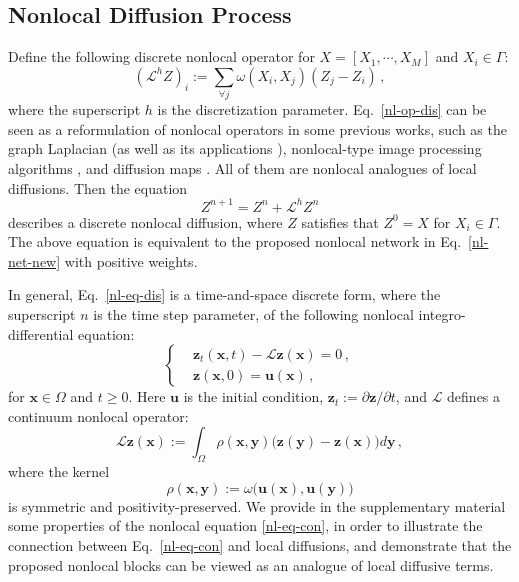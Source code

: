 \documentclass{article}
\newcommand{\xb}{\bm{x}}
\newcommand{\yb}{\bm{y}}
\newcommand{\zb}{\bm{z}}
\newcommand{\ub}{\bm{u}}
\begin{document}
\subsection{Nonlocal Diffusion Process}
Define the following discrete nonlocal operator for $X=[X_1,\cdots,X_M]$ and $X_i\in\Gamma$:
\begin{equation}\label{nl-op-dis}
(\mathcal{L}^h Z)_i := \sum_{\forall j} \omega(X_i,X_j)(Z_j-Z_i)\,,
\end{equation}
where the superscript $h$ is the discretization parameter. Eq.~\eqref{nl-op-dis} can be seen as a reformulation of nonlocal operators in some previous works, such as the graph Laplacian \cite{chung1997spectral} (as well as its applications \cite{liu2009robust,liu2010large,liu2012robust,wu2018multi}), nonlocal-type image processing algorithms \cite{buades2005review,gilboa2007nonlocal}, and diffusion maps \cite{coifman2006diffusion}. All of them are nonlocal analogues \cite{du2012analysis} of local diffusions. %
Then the equation
\begin{equation}\label{nl-eq-dis}
Z^{n+1} = Z^{n} + \mathcal{L}^h Z^n
\end{equation}
describes a discrete nonlocal diffusion, where $Z$ satisfies that $Z^0 = X$ for $X_i\in\Gamma$. The above equation is equivalent to the proposed nonlocal network in Eq.~\eqref{nl-net-new} with positive weights.

In general, Eq.~\eqref{nl-eq-dis} is a time-and-space discrete form, where the superscript $n$ is the time step parameter, of the following nonlocal integro-differential equation:
\begin{equation}\label{nl-eq-con}
\left\{
\begin{aligned}
&\zb_t(\xb,t)-\mathcal{L} \zb(\xb)=0\,,\\
& \zb(\xb,0)=\ub(\xb)\,,
\end{aligned}
\right.
\end{equation}
for $\xb\in\Omega$ and $t\ge0$. Here $\ub$ is the initial condition, $\zb_t:=\partial\zb / \partial t$, and $\mathcal{L}$ defines a continuum nonlocal operator:
\begin{equation}
\mathcal{L}\zb(\xb) := \int_\Omega \rho(\xb,\yb)\big(\zb(\yb)-\zb(\xb)\big)d\yb\,,
\end{equation}
where the kernel
\begin{equation}
\rho(\xb,\yb):=\omega\big(\ub(\xb),\ub(\yb)\big)
\end{equation}
is symmetric and positivity-preserved. We provide in the supplementary material some properties of the nonlocal equation \eqref{nl-eq-con}, in order to illustrate the connection between Eq.~\eqref{nl-eq-con} and local diffusions, and demonstrate that the proposed nonlocal blocks can be viewed as an analogue of local diffusive terms. 
\end{document}
